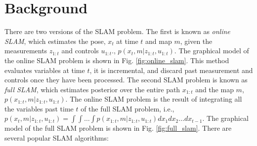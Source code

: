\documentclass[10pt,journal,compsoc]{IEEEtran}
\begin{document}


%
%
%



   

\section{Background}

There are two versions of the SLAM problem. The first is known as \textit{online SLAM}, which estimates the pose, $x_t$ at time $t$ and map $m$, given the measurements  $z_{1:t}$ and controls $u_{1:t}$., $p(x_t, m | z_{1:t}, u_{1:t})$. The graphical model of the online SLAM problem is shown in Fig. \ref{fig:online_slam}. This method evaluates variables at time $t$, it is incremental, and discard past measurement and controls once they have been processed.  The second SLAM problem is known as \textit{full SLAM}, which estimates posterior over the entire path $x_{1:t}$ and the map $m$, $p(x_{1:t}, m | z_{1:t}, u_{1:t})$. The online SLAM problem is the result of integrating all the variables past time $t$ of the full SLAM problem, i.e., $p(x_t, m | z_{1:t}, u_{1:t}) = \int \int \dots \int p(x_{1:t}, m | z_{1:t}, u_{1:t}) dx_1 dx_2 \dots dx_{t-1}$. The graphical model of the full SLAM problem is shown in Fig. \ref{fig:full_slam}. There are several popular SLAM algorithms: 
\end{document}
